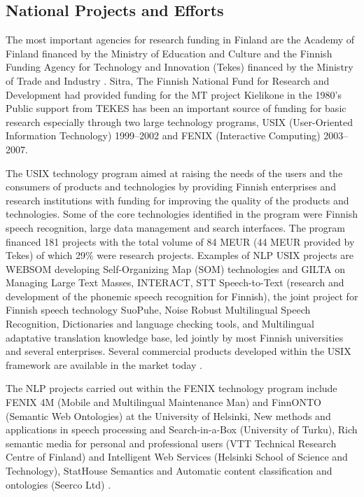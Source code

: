 \begin{multicols}{2}
\subsection{National Projects and Efforts}

The most important agencies for research funding in Finland are the Academy of Finland financed by the Ministry of Education and Culture and the Finnish Funding Agency for Technology and Innovation (Tekes) financed by the Ministry of Trade and Industry \cite{Leading}.  Sitra, The Finnish National Fund for Research and Development had provided funding for the MT project Kielikone in the 1980's Public support from TEKES has been an important source of funding for basic research especially through two large technology programs, USIX (User-Oriented Information Technology) 1999--2002 and FENIX (Interactive Computing) 2003--2007.

The USIX technology program aimed at raising the needs of the users and the consumers of products and technologies by providing Finnish enterprises and research institutions with funding for improving the quality of the products and technologies. Some of the core technologies identified in the program were Finnish speech recognition, large data management and search interfaces. The program financed 181 projects with the total volume of 84 MEUR (44 MEUR provided by Tekes) of which 29\% were research projects. Examples of NLP USIX projects are WEBSOM developing Self-Organizing Map (SOM) technologies and GILTA on Managing Large Text Masses, INTERACT, STT Speech-to-Text (research and development of the phonemic speech recognition for Finnish), the joint project for Finnish speech technology SuoPuhe, Noise Robust Multilingual Speech Recognition, Dictionaries and language checking tools, and Multilingual adaptative translation knowledge base, led jointly by most Finnish universities and several enterprises. Several commercial products developed within the USIX framework are available in the market today \cite{LoppuUSIX}.

The NLP projects carried out within the FENIX technology program include FENIX 4M (Mobile and Multilingual Maintenance Man) and FinnONTO (Semantic Web Ontologies) at the University of Helsinki, New methods and applications in speech processing and Search-in-a-Box (University of Turku), Rich semantic media for personal and professional users (VTT Technical Research Centre of Finland) and Intelligent Web Services (Helsinki School of Science and Technology), StatHouse Semantics and Automatic content classification and ontologies (Seerco Ltd) \cite{FinalFENIX}.


\end{multicols}
